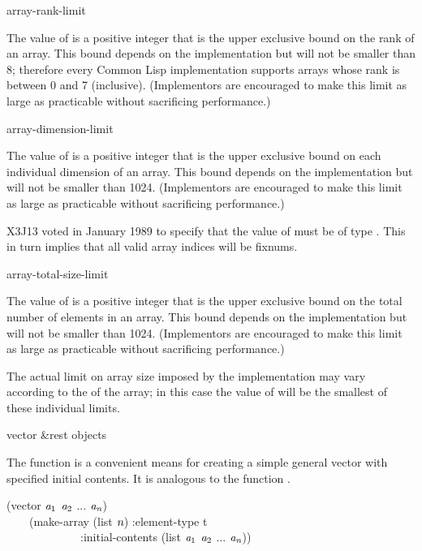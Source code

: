 \begin{defun}[Constant]
array-rank-limit

The value of  is a positive integer that is
the upper exclusive bound on the rank of an array.
This bound depends on the implementation
but will not be smaller than 8; therefore every Common Lisp implementation
supports arrays whose rank is between 0 and 7 (inclusive).
(Implementors are encouraged to make this limit as large as practicable
without sacrificing performance.)
\end{defun}

\begin{defun}[Constant]
array-dimension-limit

The value of  is a positive integer that is
the upper exclusive bound on each individual dimension of an array.
This bound depends on the implementation
but will not be smaller than 1024.
(Implementors are encouraged to make this limit as large as practicable
without sacrificing performance.)

\begin{new}
X3J13 voted in January 1989
to specify that the value
of  must be of type .
This in turn implies that all valid array indices will be fixnums.
\end{new}

\end{defun}

\begin{defun}[Constant]
array-total-size-limit

The value of  is a positive integer that is
the upper exclusive bound on the total number of elements in an array.
This bound depends on the implementation
but will not be smaller than 1024.
(Implementors are encouraged to make this limit as large as practicable
without sacrificing performance.)

The actual limit on array size imposed by the implementation may vary
according to the  of the array; in this case the value of
 will be the smallest of these individual
limits.
\end{defun}

\begin{defun}[Function]
vector &rest objects

The function  is a convenient means for creating
a simple general vector with specified initial contents.
It is analogous to the function .
\begin{lisp}
(vector $\emph{a}_1$ $\emph{a}_2$ ... $\emph{a}_{\hbox{\scriptsize\it n}}$) \\
~~~\EQ\ (make-array (list $\emph{n}$) :element-type t \\
~~~~~~~~~~~~~:initial-contents (list $\emph{a}_1$ $\emph{a}_2$ ... $\emph{a}_{\hbox{\scriptsize\it n}}$))
\end{lisp}
\end{defun}

